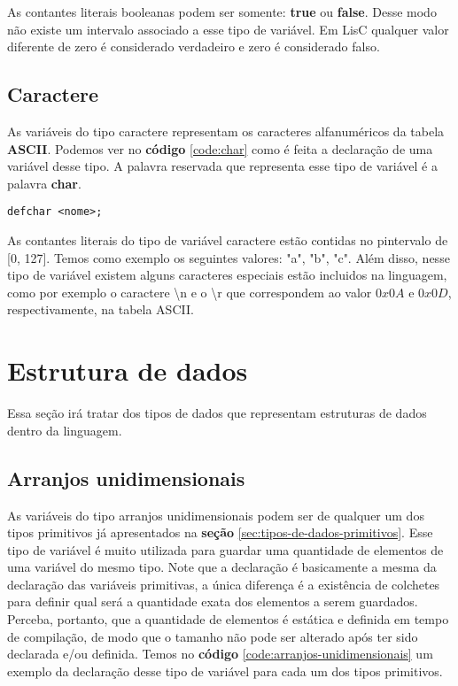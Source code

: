 \documentclass[
  12pt,				%
  oneside,			%
  a4paper,			%
  english,			%
  french,				%
  spanish,			%
  brazil,				%
]{abntex2}
\begin{document}
As contantes literais booleanas podem ser somente: \textbf{true} ou
\textbf{false}. Desse modo não existe um intervalo associado a esse
tipo de variável. Em LisC qualquer valor diferente de zero é
considerado verdadeiro e zero é considerado
falso.

\subsection{Caractere}
\label{subsec:caractere}

As variáveis do tipo caractere representam os caracteres
alfanuméricos da tabela \textbf{ASCII}. Podemos ver no \textbf{código}
\ref{code:char} como é feita a declaração de uma variável desse
tipo. A palavra reservada que representa esse tipo de variável é a palavra \textbf{char}.

\begin{lstlisting}[label=code:char,caption=Declaração de uma variável caractere]
  defchar <nome>;
\end{lstlisting}

As contantes literais do tipo de variável caractere estão contidas no
pintervalo de [0, 127]. Temos como exemplo os seguintes valores: "a",
"b", "c". Além disso, nesse tipo de variável existem alguns caracteres
especiais estão incluidos na linguagem, como por exemplo o caractere
\textbackslash n e o \textbackslash r que
correspondem ao valor $0x0A$ e $0x0D$, respectivamente, na tabela ASCII.

\section{Estrutura de dados}
\label{sec:estrutura-de-dados}

Essa seção irá tratar dos tipos de dados que representam estruturas de
dados dentro da linguagem.

\subsection{Arranjos unidimensionais}
\label{subsec:arranjos-unidimensionais}

As variáveis do tipo arranjos unidimensionais podem ser de qualquer um
dos tipos primitivos já apresentados na \textbf{seção}
\ref{sec:tipos-de-dados-primitivos}. Esse tipo de variável é muito
utilizada para guardar uma quantidade de elementos de uma variável do mesmo
tipo. Note que a declaração é basicamente a mesma da declaração das
variáveis primitivas, a única diferença é a existência de colchetes
para definir qual será a quantidade exata dos elementos a serem
guardados. Perceba, portanto, que a quantidade de elementos é estática
e definida em tempo de compilação, de modo que o tamanho não pode ser
alterado após ter sido declarada e/ou definida. Temos no
\textbf{código} \ref{code:arranjos-unidimensionais} um exemplo da
declaração desse tipo de variável para cada um dos tipos primitivos.
\end{document}
